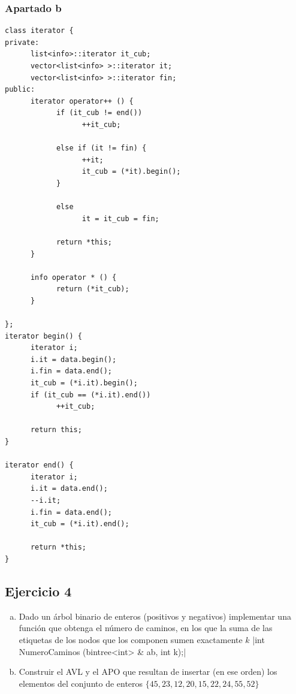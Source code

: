 \documentclass[10pt,a4paper,spanish]{report}
\begin{document}
\subsubsection{\textcolor[rgb]{0.5,0.8,1}Apartado b}
\begin{verbatim}
class iterator {
private:
      list<info>::iterator it_cub;
      vector<list<info> >::iterator it;
      vector<list<info> >::iterator fin;
public:
      iterator operator++ () {
            if (it_cub != end())
                  ++it_cub;

            else if (it != fin) {
                  ++it;
                  it_cub = (*it).begin();
            }

            else
                  it = it_cub = fin;

            return *this;
      }

      info operator * () {
            return (*it_cub);
      }

};
iterator begin() {
      iterator i;
      i.it = data.begin();
      i.fin = data.end();
      it_cub = (*i.it).begin();
      if (it_cub == (*i.it).end())
            ++it_cub;

      return this;
}

iterator end() {
      iterator i;
      i.it = data.end();
      --i.it;
      i.fin = data.end();
      it_cub = (*i.it).end();

      return *this;
}
\end{verbatim}

\subsection{\textcolor[rgb]{0.5,0.8,1}Ejercicio 4}
\begin{enumerate}[a)]
      \item Dado un árbol binario de enteros (positivos y negativos) implementar una función que obtenga el número de caminos, en los que la suma de las etiquetas de los nodos que los componen sumen exactamente $k$
      |int NumeroCaminos (bintree<int> & ab, int k);|
      \item Construir el AVL y el APO que resultan de insertar (en ese orden) los elementos del conjunto de enteros $\{45,23,12,20,15,22,24,55,52\}$
\end{enumerate}
\end{document}

